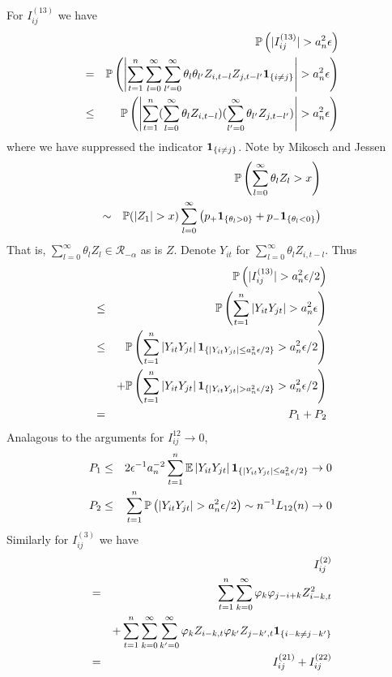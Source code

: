 \documentclass{article}
\begin{document}
For $I_{ij}^{(13)}$ we have
\begin{eqnarray*}
  && \mathbb{P}\left(|I_{ij}^{(13)}| > a_n^{2}\epsilon\right) \\
  &=& \mathbb{P}\left(\left|\sum_{t=1}^n \sum_{l=0}^\infty \sum_{l'=0}^\infty
  \theta_l\theta_{l'} Z_{i,t-l} Z_{j,t-l'} \mathbf{1}_{\{i\neq j\}}\right| > a_n^2
\epsilon\right) \\
&\leq& \mathbb{P}\left(\left|\sum_{t=1}^n (\sum_{l=0}^\infty \theta_l
    Z_{i,t-l}) (\sum_{l'=0}^\infty \theta_{l'} Z_{j,t-l'})\right| >
  a_n^2 \epsilon\right) \\
\end{eqnarray*}
where we have suppressed the indicator $\mathbf{1}_{\{i\neq j\}}$. Note by Mikosch
and Jessen \cite{JessenMikosch2006}
\begin{eqnarray*}
  && \mathbb{P}\left( \sum_{l=0}^\infty \theta_l Z_{l} > x \right) \\
  &\sim& \mathbb{P}(|Z_1| > x) \sum_{l=0}^\infty \left(
    p_+ \mathbf{1}_{\{\theta_l > 0\}} + p_- \mathbf{1}_{\{\theta_l < 0\}}
  \right)
\end{eqnarray*}
That is, $\sum_{l=0}^\infty \theta_l Z_{l} \in \mathcal R_{-\alpha}$
as is $Z$. Denote $Y_{it}$ for $\sum_{l=0}^\infty \theta_l
Z_{i,t-l}$. Thus
\begin{eqnarray*}
  && \mathbb{P}\left(|I_{ij}^{(13)}| > a_n^{2}\epsilon/2\right) \\
  &\leq& \mathbb{P}\left( \sum_{t=1}^n \left| Y_{it} Y_{jt} \right| > a_n^2
    \epsilon \right) \\
  &\leq& \mathbb{P}\left( \sum_{t=1}^n \left| Y_{it} Y_{jt} \right| \mathbf{1}_{\{|Y_{it}
      Y_{jt}| \leq a_n^2 \epsilon / 2\}} > a_n^2 \epsilon/2 \right) \\
  && + \mathbb{P}\left( \sum_{t=1}^n \left| Y_{it} Y_{jt} \right| \mathbf{1}_{\{|Y_{it}
      Y_{jt}| > a_n^2 \epsilon / 2\}} > a_n^2 \epsilon/2 \right) \\
  &=& P_1 + P_2
\end{eqnarray*}
Analagous to the arguments for $I_{ij}^{12} \to 0$,
\begin{eqnarray*}
  P_1 &\leq& 2 \epsilon^{-1} a_n^{-2}\sum_{t=1}^n \mathbb{E} \left| Y_{it}
    Y_{jt} \right| \mathbf{1}_{\{|Y_{it} Y_{jt}| \leq a_n^2 \epsilon / 2\}} \to 0 \\
  P_2 &\leq& \sum_{t=1}^n \mathbb{P}\left(
    |Y_{it} Y_{jt}| > a_n^2 \epsilon / 2
  \right) \sim n^{-1} L_{12}(n) \to 0
\end{eqnarray*}
Similarly for $I^{(3)}_{ij}$ we have
\begin{eqnarray*}
  && I^{(2)}_{ij} \\
  &=& \sum_{t=1}^n \sum_{k=0}^\infty \varphi_k \varphi_{j-i+k}
  Z_{i-k,t}^2  \\
  && + \sum_{t=1}^n \sum_{k=0}^\infty \sum_{k'=0}^\infty \varphi_k
  Z_{i-k,t}  \varphi_{k'} Z_{j-k',t} \mathbf{1}_{\{i-k\neq j-k'\}}\\
  &=& I^{(21)}_{ij} + I^{(22)}_{ij}
\end{eqnarray*}
\end{document}
